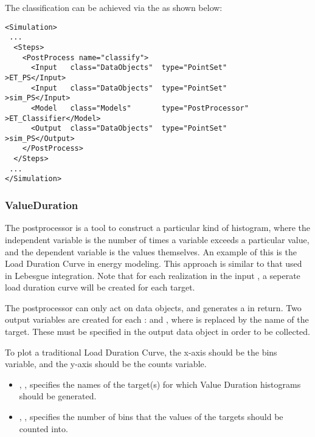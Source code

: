The classification can be achieved via the  as shown below:
\begin{lstlisting}[style=XML]
<Simulation>
 ...
  <Steps>
    <PostProcess name="classify">
      <Input   class="DataObjects"  type="PointSet"        >ET_PS</Input>
      <Input   class="DataObjects"  type="PointSet"        >sim_PS</Input>
      <Model   class="Models"       type="PostProcessor"   >ET_Classifier</Model>
      <Output  class="DataObjects"  type="PointSet"        >sim_PS</Output>
    </PostProcess>
  </Steps>
 ...
</Simulation>
\end{lstlisting}

\subsubsection{ValueDuration}
\label{ValueDurationPP}
The  postprocessor is a tool to construct a particular kind of histogram, where the
independent variable is the number of times a variable exceeds a particular value, and the dependent variable
is the values themselves.  An example of this is the Load Duration Curve in energy modeling. This approach is
similar to that used in Lebesgue integration. Note that for each realization in the input
, a seperate load duration curve will be created for each target.

The  postprocessor can only act on  data objects, and generates a
 in return.  Two output variables are created for each :
 and , where  is replaced by the name of the target.
These must be specified in the output data object in order to be collected.

To plot a traditional Load Duration Curve, the x-axis should be the bins variable, and the y-axis should be
the counts variable.

%
\begin{itemize}
  \item {}, , specifies the names of the
    target(s) for which Value Duration histograms should be generated.
  \item {}, , specifies the number of bins that the values of the
    targets should be counted into.
\end{itemize}

